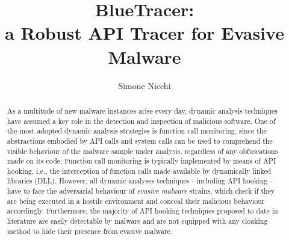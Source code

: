 \documentclass[LaM,english,noexaminfo,oneside]{sapthesis} %
\title{BlueTracer: \\ a Robust API Tracer for Evasive Malware}
\author{Simone Nicchi}
\begin{document}
\frontmatter
\maketitle
\dedication{Ai miei genitori, che non hanno mai smesso di supportarmi}

\begingroup
\clearpage%
\let\clearpage\relax%
\vspace*{-2cm}%


\begin{abstract}

\iffalse     
With thousands of new malware samples surfacing every day, dy-
namic analysis techniques play a fundamental role in the automatic
characterization and detection of malicious behaviors that under-
mine the security of computing systems. And yet, often new threats
emerge that defeat automatic analysis, requiring them to be manu-
ally dissected by expert analysts. A significant fraction of strains
adopt however evasion techniques that hide their malicious behav-
ior if they are under the magnifying glass of an analyst, hindering
the analysis. We propose a methodology for hardening automatic
dynamic analysis techniques to make them more robust against
evasive malware. We build on binary instrumentation and we show
that more than 100 different anti-evasion techniques can be imple-
mented in terms of a minimal core of primitives to withstand com-
mon evasive behaviors. We discuss an embodiment of our approach
in the Pin dynamic binary instrumentation framework showing
how to construct a customizable stealthy sandbox that supports
remote debugging and dynamic taint analysis. We evaluate our
tool on a set of highly evasive malware samples and show how
taint analysis can help analysts to identify new evasive techniques;
countermeasures can then be incorporated into the analysis system
as part of a human-assisted feedback loop mechanism.
\fi

As a multitude of new malware instances arise every day, dynamic analysis techniques have assumed a key role in the detection and inspection of malicious software. One of the most adopted dynamic analysis strategies is function call monitoring, since the abstractions embodied by API calls and system calls can be used to comprehend the visible behaviour of the malware sample under analysis, regardless of any obfuscations made on its code. Function call monitoring is typically implemented by means of API hooking, i.e., the interception of function calls made available by dynamically linked libraries (DLL). However, all dynamic analyses techniques - including API hooking - have to face the adversarial behaviour of \textit{evasive malware} strains, which check if they are being executed in a hostile environment and conceal their malicious behaviour accordingly. Furthermore, the majority of API hooking techniques proposed to date in literature are easily detectable by malware and are not equipped with any cloaking method to hide their presence from evasive malware.


\end{abstract}
\end{document}
